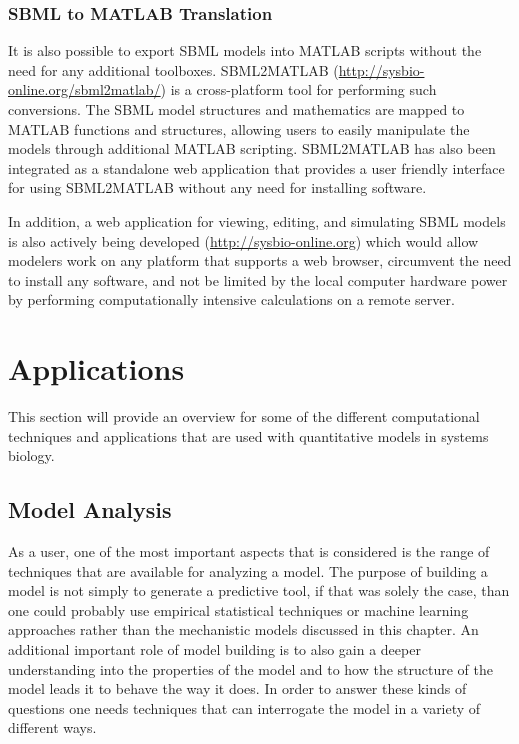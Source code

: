 \subsubsection{SBML to MATLAB Translation}

It is also possible to export SBML models into MATLAB scripts without
the need for any additional toolboxes. SBML2MATLAB
(\url{http://sysbio-online.org/sbml2matlab/}) is a cross-platform tool
for performing such conversions. The SBML model structures and
mathematics are mapped to MATLAB functions and structures, allowing
users to easily manipulate the models through additional MATLAB
scripting. SBML2MATLAB has also been integrated as a standalone web
application that provides a user friendly interface for using
SBML2MATLAB without any need for installing software.

In addition, a web application for viewing, editing, and simulating SBML
models is also actively being developed (\url{http://sysbio-online.org})
which would allow modelers work on any platform that supports a web
browser, circumvent the need to install any software, and not be limited
by the local computer hardware power by performing computationally
intensive calculations on a remote server.

\section{Applications}

This section will provide an overview for some of the different
computational techniques and applications that are used with
quantitative models in systems biology.

\subsection{Model Analysis}

As a user, one of the most important aspects that is considered is the
range of techniques that are available for analyzing a model. The
purpose of building a model is not simply to generate a predictive tool,
if that was solely the case, than one could probably use empirical
statistical techniques or machine learning approaches rather than the
mechanistic models discussed in this chapter. An additional important
role of model building is to also gain a deeper understanding into the
properties of the model and to how the structure of the model leads it
to behave the way it does. In order to answer these kinds of questions
one needs techniques that can interrogate the model in a variety of
different ways.

